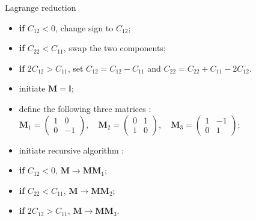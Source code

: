 \documentclass[10pt, aspectratio=169]{beamer}
\begin{document}
\begin{frame}{Lagrange reduction}
    
    \vspace{0.4cm}
    \begin{itemize}
        \setlength\itemsep{0.3cm}
        \item \textbf{if} $C_{12} < 0$, change sign to $C_{12}$;
        \item \textbf{if} $C_{22} < C_{11}$, swap the two components;
        \item \textbf{if} $2C_{12} > C_{11}$, set $C_{12} = C_{12} - C_{11}$ and $C_{22} = C_{22} + C_{11} - 2C_{12}$.
    \end{itemize}
    
    \vspace{0.8cm}
    \begin{itemize}
        \setlength\itemsep{0.3cm}
        \item initiate $\mathbf{M} = \mathbb{I}$;
        \item define the following three matrices : \quad
              $\displaystyle \mathbf{M}_1 = \begin{pmatrix} 1 & 0 \\ 0 & -1 \end{pmatrix}, \quad \mathbf{M}_2 = \begin{pmatrix} 0 & 1 \\ 1 & 0 \end{pmatrix}, \quad \mathbf{M}_3 = \begin{pmatrix} 1 & -1 \\ 0 & 1 \end{pmatrix}$;
        \item initiate recursive algorithm :
        \item \textbf{if} $C_{12} < 0$, \quad $\mathbf{M} \rightarrow \mathbf{M}\mathbf{M}_1$;
        \item \textbf{if} $C_{22} < C_{11}$, \quad $\mathbf{M} \rightarrow \mathbf{M}\mathbf{M}_2$;
        \item \textbf{if} $2C_{12} > C_{11}$, \quad $\mathbf{M} \rightarrow \mathbf{M}\mathbf{M}_3$.
    \end{itemize}
    
\end{frame}
\end{document}
